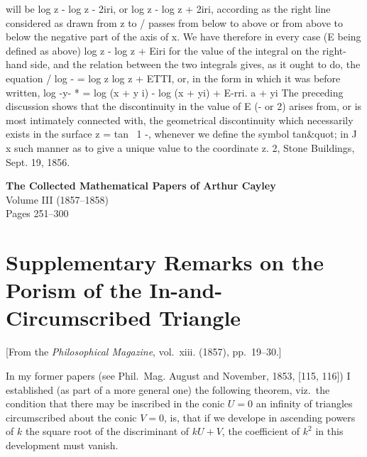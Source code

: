 \documentclass[11pt,a4paper]{book}
\begin{document}
{{%

will
be
log z - log z - 2iri,
or
log z - log z + 2iri, according
as
the
right
line considered
as
drawn
from
z
to
/
passes
from
below
to
above
or
from
above
to
below
the
negative
part
of
the
axis
of
x.
We
have
therefore
in
every
case
(E
being
defined
as
above)
log z - log z + Eiri
for
the
value
of
the
integral
on
the right-hand
side, and
the relation between the two
integrals
gives,
as
it ought
to
do, the equation
/
log - = log z
log z + ETTI,
or,
in the form
in which
it was before
written,
log
-y-
* = log (x + y i) - log (x + yi) + E-rri.
a + yi
The preceding discussion shows that the discontinuity in the value
of E (-
or
2)
arises
from,
or
is
most
intimately
connected
with,
the
geometrical
discontinuity
which
necessarily
exists
in
the
surface
z = tan~
1 -,
whenever
we
define
the
symbol
tan\&quot;
in
J
x
such manner
as
to give a unique value
to the coordinate
z.
2, Stone Buildings,
Sept.
19,
1856.
\clearpage


\begin{center}
{\Large\bfseries The Collected Mathematical Papers of Arthur Cayley}\\[1em]
{\large Volume III (1857--1858)}\\[1em]
{\normalsize Pages 251--300}\\[2em]
\end{center}


\newpage


\section{Supplementary Remarks on the Porism of the In-and-Circumscribed Triangle}
\label{sec:202}

[From the \textit{Philosophical Magazine}, vol.~xiii. (1857), pp.~19--30.]
\vspace{1em}

In my former papers (see Phil.~Mag. August and November, 1853, [115, 116]) I established (as part of a more general one) the following theorem, viz.\ the condition that there may be inscribed in the conic $U=0$ an infinity of triangles circumscribed about the conic $V=0$, is, that if we develope in ascending powers of $k$ the square root of the discriminant of $kU+V$, the coefficient of $k^2$ in this development must vanish.

}}
\end{document}

